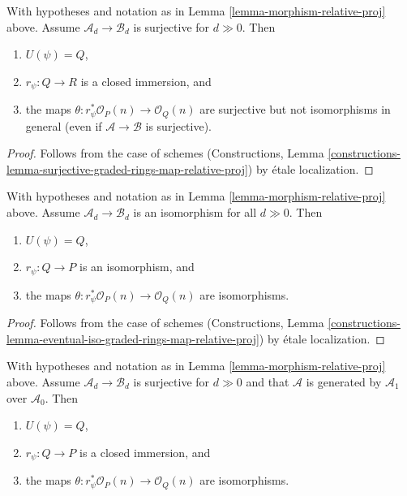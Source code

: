 \begin{lemma}
\label{lemma-surjective-graded-rings-map-relative-proj}
With hypotheses and notation as in Lemma \ref{lemma-morphism-relative-proj}
above. Assume $\mathcal{A}_d \to \mathcal{B}_d$ is surjective for
$d \gg 0$. Then
\begin{enumerate}
\item $U(\psi) = Q$,
\item $r_\psi : Q \to R$ is a closed immersion, and
\item the maps $\theta : r_\psi^*\mathcal{O}_P(n) \to \mathcal{O}_Q(n)$
are surjective but not isomorphisms in general (even if
$\mathcal{A} \to \mathcal{B}$ is surjective).
\end{enumerate}
\end{lemma}

\begin{proof}
Follows from the case of schemes
(Constructions, Lemma
\ref{constructions-lemma-surjective-graded-rings-map-relative-proj})
by \'etale localization.
\end{proof}

\begin{lemma}
\label{lemma-eventual-iso-graded-rings-map-relative-proj}
With hypotheses and notation as in Lemma \ref{lemma-morphism-relative-proj}
above. Assume $\mathcal{A}_d \to \mathcal{B}_d$ is an isomorphism for all
$d \gg 0$. Then
\begin{enumerate}
\item $U(\psi) = Q$,
\item $r_\psi : Q \to P$ is an isomorphism, and
\item the maps $\theta : r_\psi^*\mathcal{O}_P(n) \to \mathcal{O}_Q(n)$
are isomorphisms.
\end{enumerate}
\end{lemma}

\begin{proof}
Follows from the case of schemes
(Constructions, Lemma
\ref{constructions-lemma-eventual-iso-graded-rings-map-relative-proj})
by \'etale localization.
\end{proof}

\begin{lemma}
\label{lemma-surjective-generated-degree-1-map-relative-proj}
With hypotheses and notation as in Lemma \ref{lemma-morphism-relative-proj}
above. Assume $\mathcal{A}_d \to \mathcal{B}_d$ is surjective for $d \gg 0$
and that $\mathcal{A}$ is generated by $\mathcal{A}_1$ over $\mathcal{A}_0$.
Then
\begin{enumerate}
\item $U(\psi) = Q$,
\item $r_\psi : Q \to P$ is a closed immersion, and
\item the maps $\theta : r_\psi^*\mathcal{O}_P(n) \to \mathcal{O}_Q(n)$
are isomorphisms.
\end{enumerate}
\end{lemma}


